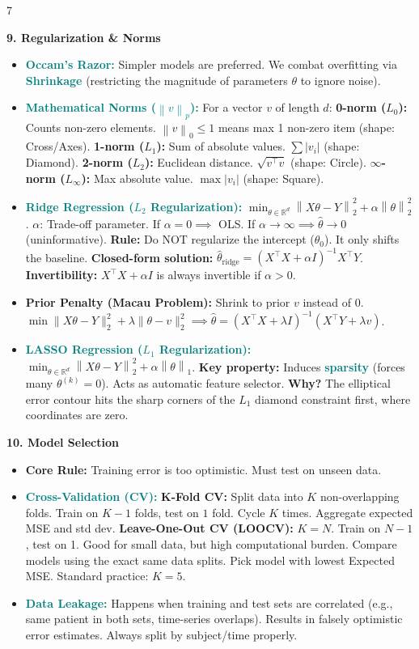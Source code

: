 \documentclass{article}
\newcommand{\norm}[1]{\left\lVert#1\right\rVert}
\newcommand{\R}{\mathbb{R}}
\newcommand{\hlhighlight}[1]{\par\vspace{1.5pt}\noindent\colorbox{yellow!50}{\parbox{\dimexpr\columnwidth-2\fboxsep\relax}{\textbf{#1}}}\par\vspace{0.5pt}}
\newcommand{\sectitle}[1]{\par\textbf{\color{blue!70!black}{#1}}\par}
\newcommand{\concept}[1]{\textcolor{teal}{\textbf{#1}}}
\newcommand{\lbl}[1]{\textcolor{green!60!black}{\textbf{#1}}}
\begin{document}
\begin{multicols}{7}
\hlhighlight{9. Regularization \& Norms}
\sectitle{Shrinkage \& Penalties}
\begin{itemize}
    \item \concept{Occam's Razor:} Simpler models are preferred. We combat overfitting via \concept{Shrinkage} (restricting the magnitude of parameters $\theta$ to ignore noise).
    \item \concept{Mathematical Norms ($\norm{v}_p$):} For a vector $v$ of length $d$: \lbl{0-norm ($L_0$):} Counts non-zero elements. $\norm{v}_0 \leq 1$ means max 1 non-zero item (shape: Cross/Axes). \lbl{1-norm ($L_1$):} Sum of absolute values. $\sum |v_i|$ (shape: Diamond). \lbl{2-norm ($L_2$):} Euclidean distance. $\sqrt{v^\top v}$ (shape: Circle). \lbl{$\infty$-norm ($L_\infty$):} Max absolute value. $\max |v_i|$ (shape: Square).
    \item \concept{Ridge Regression ($L_2$ Regularization):} $\min_{\theta \in \R^d} \norm{X\theta - Y}_2^2 + \alpha \norm{\theta}_2^2$. $\alpha$: Trade-off parameter. If $\alpha=0 \implies$ OLS. If $\alpha \to \infty \implies \hat{\theta} \to 0$ (uninformative). \lbl{Rule:} Do NOT regularize the intercept ($\theta_0$). It only shifts the baseline. \lbl{Closed-form solution:} $\hat{\theta}_{\text{ridge}} = (X^\top X + \alpha I)^{-1} X^\top Y$. \lbl{Invertibility:} $X^\top X + \alpha I$ is always invertible if $\alpha > 0$.
    \item \lbl{Prior Penalty (Macau Problem):} Shrink to prior $v$ instead of 0. $\min \|X\theta - Y\|_2^2 + \lambda \|\theta - v\|_2^2 \implies \hat{\theta} = (X^\top X + \lambda I)^{-1}(X^\top Y + \lambda v)$.
    \item \concept{LASSO Regression ($L_1$ Regularization):} $\min_{\theta \in \R^d} \norm{X\theta - Y}_2^2 + \alpha \norm{\theta}_1$. \lbl{Key property:} Induces \concept{sparsity} (forces many $\theta^{(k)} = 0$). Acts as automatic feature selector. \lbl{Why?} The elliptical error contour hits the sharp corners of the $L_1$ diamond constraint first, where coordinates are zero.
\end{itemize}

\hlhighlight{10. Model Selection}
\sectitle{Testing \& Validation}
\begin{itemize}
    \item \lbl{Core Rule:} Training error is too optimistic. Must test on unseen data.
    \item \concept{Cross-Validation (CV):} \lbl{K-Fold CV:} Split data into $K$ non-overlapping folds. Train on $K-1$ folds, test on $1$ fold. Cycle $K$ times. Aggregate expected MSE and std dev. \lbl{Leave-One-Out CV (LOOCV):} $K=N$. Train on $N-1$, test on 1. Good for small data, but high computational burden. Compare models using the exact same data splits. Pick model with lowest Expected MSE. Standard practice: $K=5$.
    \item \concept{Data Leakage:} Happens when training and test sets are correlated (e.g., same patient in both sets, time-series overlaps). Results in falsely optimistic error estimates. Always split by subject/time properly.
\end{itemize}


\end{multicols}
\end{document}
